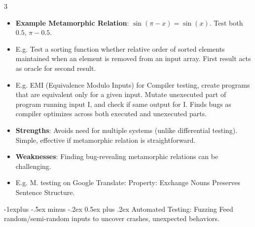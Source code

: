 \documentclass[a4paper, 10pt, landscape]{article}
\makeatletter
\renewcommand{\subsection}{\@startsection{subsection}{2}{0mm}%
                                {-1explus -.5ex minus -.2ex}%
                                {0.5ex plus .2ex}%
                                {\normalfont\normalsize\bfseries}}
\makeatother
\begin{document}
\begin{multicols*}{3}
\begin{itemize}
\item \textbf{Example Metamorphic Relation}: $ \sin(\pi - x) = \sin(x) $. Test both $0.5$, $\pi - 0.5$.
\item E.g.  Test a sorting function whether relative order of sorted elements maintained when an element is removed from an input array. First result acts as oracle for second result.
\item E.g. EMI (Equivalence Modulo Inputs) for Compiler testing, create programs that are equivalent only for a given input. Mutate unexecuted part of program running input I, and check if same output for I. Finds bugs as compiler optimizes across both executed and unexecuted parts.
\item \textbf{Strengths}: Avoids need for multiple systems (unlike differential testing). Simple, effective if metamorphic relation is straightforward.
\item  \textbf{Weaknesses}: Finding bug-revealing metamorphic relations can be challenging.
\item E.g. M. testing on Google Translate: Property: Exchange Nouns Preserves Sentence Structure.
\end{itemize}
 
\subsection{Automated Testing: Fuzzing}
Feed random/semi-random inputs to uncover crashes, unexpected behaviors.


\end{multicols*}
\end{document}

